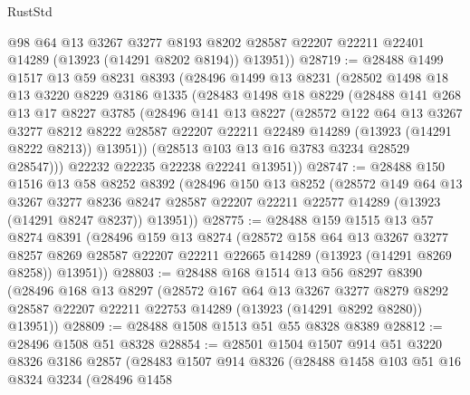 \begin{lexlean}{RustStd}
\begin{coremodule}
        @98
        @64
        @13
        @3267
        @3277
        @8193
        @8202
        @28587
        @22207
        @22211
        @22401
        @14289
        (@13923 (@14291 @8202 @8194))
        @13951))
@28719 := @28488
    @1499
    @1517
    @13
    @59
    @8231
    @8393
    (@28496
      @1499
      @13
      @8231
      (@28502
        @1498
        @18
        @13
        @3220
        @8229
        @3186
        @1335
        (@28483
          @1498
          @18
          @8229
          (@28488
            @141
            @268
            @13
            @17
            @8227
            @3785
            (@28496
              @141
              @13
              @8227
              (@28572
                @122
                @64
                @13
                @3267
                @3277
                @8212
                @8222
                @28587
                @22207
                @22211
                @22489
                @14289
                (@13923 (@14291 @8222 @8213))
                @13951))
            (@28513 @103 @13 @16 @3783 @3234 @28529 @28547)))
        @22232
        @22235
        @22238
        @22241
        @13951))
@28747 := @28488
    @150
    @1516
    @13
    @58
    @8252
    @8392
    (@28496
      @150
      @13
      @8252
      (@28572
        @149
        @64
        @13
        @3267
        @3277
        @8236
        @8247
        @28587
        @22207
        @22211
        @22577
        @14289
        (@13923 (@14291 @8247 @8237))
        @13951))
@28775 := @28488
    @159
    @1515
    @13
    @57
    @8274
    @8391
    (@28496
      @159
      @13
      @8274
      (@28572
        @158
        @64
        @13
        @3267
        @3277
        @8257
        @8269
        @28587
        @22207
        @22211
        @22665
        @14289
        (@13923 (@14291 @8269 @8258))
        @13951))
@28803 := @28488
    @168
    @1514
    @13
    @56
    @8297
    @8390
    (@28496
      @168
      @13
      @8297
      (@28572
        @167
        @64
        @13
        @3267
        @3277
        @8279
        @8292
        @28587
        @22207
        @22211
        @22753
        @14289
        (@13923 (@14291 @8292 @8280))
        @13951))
@28809 := @28488 @1508 @1513 @51 @55 @8328 @8389
@28812 := @28496 @1508 @51 @8328
@28854 := @28501
    @1504
    @1507
    @914
    @51
    @3220
    @8326
    @3186
    @2857
    (@28483
      @1507
      @914
      @8326
      (@28488
        @1458
        @103
        @51
        @16
        @8324
        @3234
        (@28496
          @1458

\end{coremodule}
\end{lexlean}
